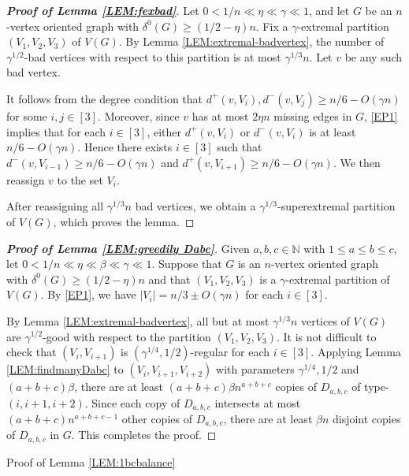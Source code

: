 \documentclass[11pt,a4paper,reqno]{amsart}
\makeatletter
\renewcommand\section{\@startsection{section}{1}%
  \z@{-1.0\linespacing\@plus-.7\linespacing}{1\linespacing}%
  {\normalfont\bfseries\large\centering}}
\theoremstyle{definition} %
\makeatother
\begin{document}
\begin{proof}[\textbf{Proof of Lemma \ref{LEM:fexbad}}]
Let $0<1/n\ll\eta\ll\gamma\ll 1$, and let $G$ be an $n$-vertex oriented graph with $\delta^0(G)\geqslant (1/2-\eta)n$. Fix a $\gamma$-extremal partition $(V_1,V_2,V_3)$ of $V(G)$. By Lemma \ref{LEM:extremal-badvertex}, the number of $\gamma^{1/2}$-bad vertices with respect to this partition is at most $\gamma^{1/3}n$. Let $v$ be any such bad vertex. 

It follows from the degree condition that $d^+(v,V_i),d^-(v,V_j)\geqslant n/6-O(\gamma n)$ for some $i,j\in[3]$. Moreover, since $v$ has at most $2\eta n$ missing edges in $G$, \ref{EP1} implies that for each $i\in[3]$, either $d^+(v,V_i)$ or $d^-(v,V_i)$ is at least $n/6-O(\gamma n)$. Hence there exists $i\in[3]$ such that $d^-(v,V_{i-1})\geqslant n/6-O(\gamma n)$ and $d^+(v,V_{i+1})\geqslant n/6-O(\gamma n)$. We then reassign $v$ to the set $V_i$.
     
After reassigning all $\gamma^{1/3}n$ bad vertices, we obtain a $\gamma^{1/3}$-superextremal partition of $V(G)$, which proves the lemma.
\end{proof}

\begin{proof}[\textbf{Proof of Lemma \ref{LEM:greedily Dabc}}]
Given $a,b,c\in \mathbb{N}$ with $1\leqslant a\leqslant b\leqslant c$, let $0<1/n\ll\eta\ll \beta\ll\gamma\ll 1$. Suppose that $G$ is an $n$-vertex oriented graph with $\delta^0(G)\geqslant (1/2-\eta)n$ and that $(V_1,V_2,V_3)$ is a $\gamma$-extremal partition of $V(G)$. By \ref{EP1}, we have $|V_i|=n/3\pm O(\gamma n)$ for each $i\in[3]$. 

By Lemma \ref{LEM:extremal-badvertex}, all but at most $\gamma^{1/3}n$ vertices of $V(G)$ are $\gamma^{1/2}$-good with respect to the partition $(V_1,V_2,V_3)$. It is not difficult to check that $(V_i,V_{i+1})$ is $(\gamma^{1/4},1/2)$-regular for each $i\in[3]$. Applying Lemma \ref{LEM:findmanyDabc} to $(V_i,V_{i+1},V_{i+2})$ with parameters $\gamma^{1/4},1/2$ and $(a+b+c)\beta$, there are at least $(a+b+c)\beta n^{a+b+c}$ copies of $D_{a,b,c}$ of type-$(i,{i+1},{i+2})$.
Since each copy of $D_{a,b,c}$ intersects at most $(a+b+c)n^{a+b+c-1}$ other copies of $D_{a,b,c}$, there are at least $\beta n$ disjoint copies of $D_{a,b,c}$ in $G$. This completes the proof.  
\end{proof}



\section{Proof of Lemma \ref{LEM:1bcbalance}}\label{SEC-5.4}
\end{document}
